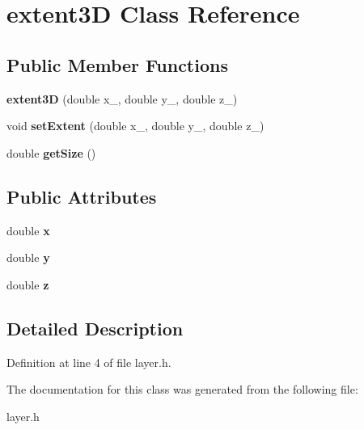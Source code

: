 \hypertarget{classextent3D}{}\section{extent3D Class Reference}
\label{classextent3D}
\subsection*{Public Member Functions}
\begin{DoxyCompactItemize}
\item 
\mbox{\label{classextent3D_a4c7d9d3faf289b7d2fcebdb3e6a059d9}} 
{\bfseries extent3D} (double x\+\_\+, double y\+\_\+, double z\+\_\+)
\item 
\mbox{\label{classextent3D_af984e85893bed0ffd4e1ee406bf7580c}} 
void {\bfseries set\+Extent} (double x\+\_\+, double y\+\_\+, double z\+\_\+)
\item 
\mbox{\label{classextent3D_aeaca37d620d74a00632f486cbb1c818e}} 
double {\bfseries get\+Size} ()
\end{DoxyCompactItemize}
\subsection*{Public Attributes}
\begin{DoxyCompactItemize}
\item 
\mbox{\label{classextent3D_ae32558ee0b7cbb81740178295cd0925a}} 
double {\bfseries x}
\item 
\mbox{\label{classextent3D_af38c998f1c089e645befc1c82b39ca32}} 
double {\bfseries y}
\item 
\mbox{\label{classextent3D_a8849ee5b9cfcb0662d6ff841157e94a5}} 
double {\bfseries z}
\end{DoxyCompactItemize}


\subsection{Detailed Description}


Definition at line 4 of file layer.\+h.



The documentation for this class was generated from the following file\+:\begin{DoxyCompactItemize}
\item 
layer.\+h\end{DoxyCompactItemize}
